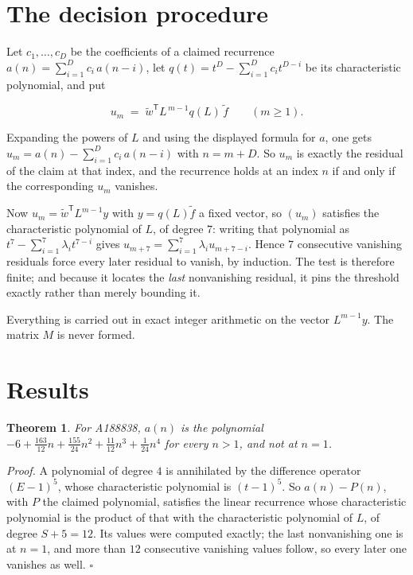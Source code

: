 \documentclass[11pt]{article}
\newtheorem{theorem}{Theorem}
\theoremstyle{definition}
\begin{document}
\section{The decision procedure}

Let $c_1,\dots,c_D$ be the coefficients of a claimed recurrence $a(n) = \sum_{i=1}^{D} c_i\,a(n-i)$, let $q(t) = t^{D} - \sum_{i=1}^{D} c_i t^{D-i}$ be its characteristic polynomial, and put

\[u_m \;=\; \tilde w^{\mathsf T} L^{\,m-1} q(L)\,\tilde f \qquad (m \ge 1).\]

Expanding the powers of $L$ and using the displayed formula for $a$, one gets $u_m = a(n) - \sum_{i=1}^{D} c_i\,a(n-i)$ with $n = m + D$. So $u_m$ is exactly the residual of the claim at that index, and the recurrence holds at an index $n$ if and only if the corresponding $u_m$ vanishes.

Now $u_m = \tilde w^{\mathsf T} L^{m-1} y$ with $y = q(L)\tilde f$ a fixed vector, so $(u_m)$ satisfies the characteristic polynomial of $L$, of degree $7$: writing that polynomial as $t^{7} - \sum_{i=1}^{7} \lambda_i t^{7-i}$ gives $u_{m+7} = \sum_{i=1}^{7} \lambda_i u_{m+7-i}$. Hence $7$ consecutive vanishing residuals force every later residual to vanish, by induction. The test is therefore finite; and because it locates the {\itshape last} nonvanishing residual, it pins the threshold exactly rather than merely bounding it.

Everything is carried out in exact integer arithmetic on the vector $L^{m-1}y$. The matrix $M$ is never formed.

\section{Results}

\begin{theorem} For A188838, $a(n)$ is the polynomial $-6 + \frac{163}{12}n + \frac{155}{24}n^{2} + \frac{11}{12}n^{3} + \frac{1}{24}n^{4}$ for every $n > 1$, and not at $n = 1$.\end{theorem}

{\itshape Proof.} A polynomial of degree $4$ is annihilated by the difference operator $(E-1)^{5}$, whose characteristic polynomial is $(t-1)^{5}$. So $a(n) - P(n)$, with $P$ the claimed polynomial, satisfies the linear recurrence whose characteristic polynomial is the product of that with the characteristic polynomial of $L$, of degree $S + 5 = 12$. Its values were computed exactly; the last nonvanishing one is at $n = 1$, and more than $12$ consecutive vanishing values follow, so every later one vanishes as well. $\square$
\end{document}
